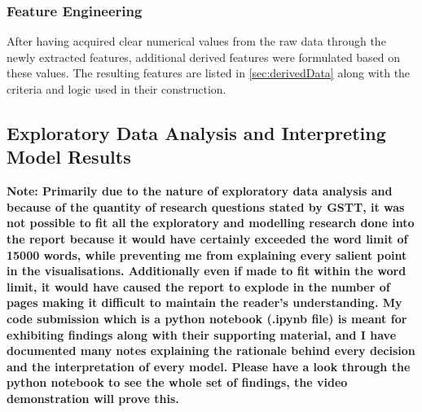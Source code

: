 \subsubsection{Feature Engineering}
\noindent After having acquired clear numerical values from the raw data through the newly extracted features, additional derived features were formulated based on these values. The resulting features are listed in \autoref{sec:derivedData} along with the criteria and logic used in their construction.   

\subsection{Exploratory Data Analysis and Interpreting Model Results}

\noindent \textbf{Note: Primarily due to the nature of exploratory data analysis and because of the quantity of research questions stated by GSTT, it was not possible to fit all the exploratory and modelling research done into the report because it would have certainly exceeded the word limit of 15000 words, while preventing me from explaining every salient point in the visualisations. Additionally even if made to fit within the word limit, it would have caused the report to explode in the number of pages making it difficult to maintain the reader's understanding. My code submission which is a python notebook (.ipynb file) is meant for exhibiting findings along with their supporting material, and I have documented many notes explaining the rationale behind every decision and the interpretation of every model. Please have a look through the python notebook to see the whole set of findings, the video demonstration will prove this.}



